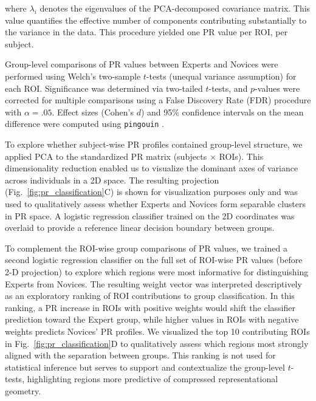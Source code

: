 \documentclass[preprint,12pt]{elsarticle}
\begin{document}
where $\lambda_i$ denotes the eigenvalues of the PCA-decomposed covariance matrix. This value quantifies the effective number of components contributing substantially to the variance in the data. This procedure yielded one PR value per ROI, per subject.

Group-level comparisons of PR values between Experts and Novices were performed using Welch’s two-sample $t$-tests (unequal variance assumption) for each ROI. Significance was determined via two-tailed $t$-tests, and $p$-values were corrected for multiple comparisons using a False Discovery Rate (FDR) procedure with $\alpha = .05$. Effect sizes (Cohen’s $d$) and 95\% confidence intervals on the mean difference were computed using \texttt{pingouin} \cite{Vallat2018}. 

To explore whether subject-wise PR profiles contained group-level structure, we applied PCA to the standardized PR matrix (subjects $\times$ ROIs). This dimensionality reduction enabled us to visualize the dominant axes of variance across individuals in a 2D space. The resulting projection (Fig.~\ref{fig:pr_classification}C) is shown for visualization purposes only and was used to qualitatively assess whether Experts and Novices form separable clusters in PR space. A logistic regression classifier trained on the 2D coordinates was overlaid to provide a reference linear decision boundary between groups.

To complement the ROI-wise group comparisons of PR values, we trained a second logistic regression classifier on the full set of ROI-wise PR values (before 2-D projection) to explore which regions were most informative for distinguishing Experts from Novices. The resulting weight vector was interpreted descriptively as an exploratory ranking of ROI contributions to group classification. In this ranking, a PR increase in ROIs with positive weights would shift the classifier prediction toward the Expert group, while higher values in ROIs with negative weights predicts Novices' PR profiles. We visualized the top 10 contributing ROIs in Fig.~\ref{fig:pr_classification}D to qualitatively assess which regions most strongly aligned with the separation between groups. This ranking is not used for statistical inference but serves to support and contextualize the group-level $t$-tests, highlighting regions more predictive of compressed representational geometry.

\newpage
\end{document}
